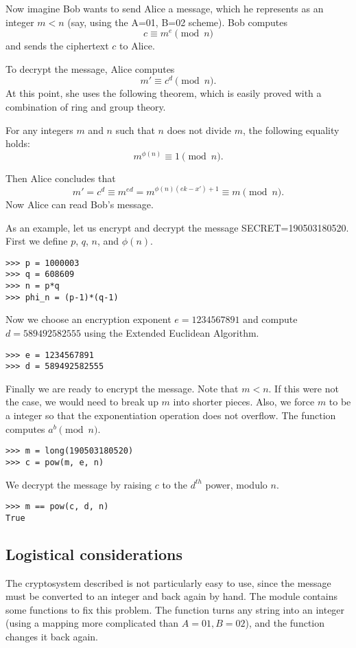 Now imagine Bob wants to send Alice a message, which he represents as an integer $m<n$ (say, using the A=01, B=02 scheme).
Bob computes 
\[
c \equiv m^e \pmod{n}
\]
and sends the ciphertext $c$ to Alice.

To decrypt the message, Alice computes
\[
m' \equiv c^d \pmod{n}.
\]
At this point, she uses the following theorem, which is easily proved with a combination of ring and group theory.
\begin{theorem}
For any integers $m$ and $n$ such that $n$ does not divide $m$, the following equality holds:
\[
m^{\phi(n)}\equiv 1 \pmod{n}.
\]
\end{theorem}
Then Alice concludes that
\[
m' = c^d \equiv m^{ed} = m^{\phi(n)(ek-x')+1} \equiv m \pmod{n}.
\]
Now Alice can read Bob's message.

As an example, let us encrypt and decrypt the message SECRET=190503180520.
First we define $p$, $q$, $n$, and $\phi(n)$.
\begin{lstlisting}
>>> p = 1000003
>>> q = 608609
>>> n = p*q
>>> phi_n = (p-1)*(q-1)
\end{lstlisting}

Now we choose an encryption exponent $e = 1234567891$ and compute $d = 589492582555$ using the Extended Euclidean Algorithm.
\begin{lstlisting}
>>> e = 1234567891
>>> d = 589492582555
\end{lstlisting}

Finally we are ready to encrypt the message. 
Note that $m<n$. If this were not the case, we would need to break up $m$ into shorter pieces.
Also, we force $m$ to be a  integer so that the exponentiation operation does not overflow.
The function  computes $a^b \pmod{n}$.
\begin{lstlisting}
>>> m = long(190503180520)
>>> c = pow(m, e, n)
\end{lstlisting}

We decrypt the message by raising $c$ to the $d^{th}$ power, modulo $n$.
\begin{lstlisting}
>>> m == pow(c, d, n)
True
\end{lstlisting}

\subsection*{Logistical considerations}
The cryptosystem described is not particularly easy to use, since the message must be converted to an integer and back again by hand.
The module  contains some functions to fix this problem.
The function  turns any string into an integer (using a mapping more complicated than $A=01, B=02$), and the function  changes it back again.

